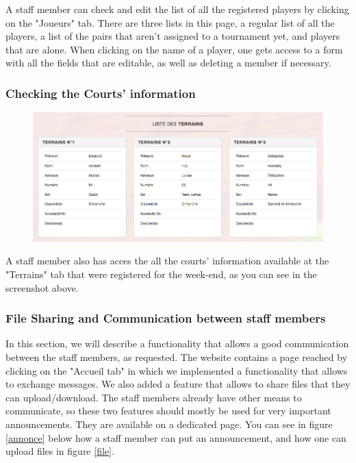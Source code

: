\documentclass[a4paper, 12pt]{article}
\begin{document}
A staff member can check and edit the list of all the registered players by clicking on the "Joueurs" tab. There are three lists in this page, a regular list of all the players, a list of the pairs that aren't assigned to a tournament yet, and players that are alone. When clicking on the name of a player, one gets access to a form with all the fields that are editable, as well as deleting a member if necessary.\\

\subsubsection*{Checking the Courts' information}
\begin{figure}[h]
\includegraphics[scale=0.5]{courts.png}
\end{figure}
A staff member also has acces the all the courts' information available at the "Terrains" tab that were registered for the week-end, as you can see in the screenshot above. 
\subsubsection*{File Sharing and Communication between staff members}

In this section, we will describe a functionality that allows a good communication between the staff members, as requested. The website contains a page reached by clicking on the "Accueil tab" in which we implemented a functionality that allows to exchange messages. We also added a feature that allows to share files that they can upload/download. The staff members already have other means to communicate, so these two features should mostly be used for very important announcements. They are available on a dedicated page. You can see in figure \ref{annonce} below how a staff member can put an announcement, and how one can upload files in figure \ref{file}.\\
\end{document}
